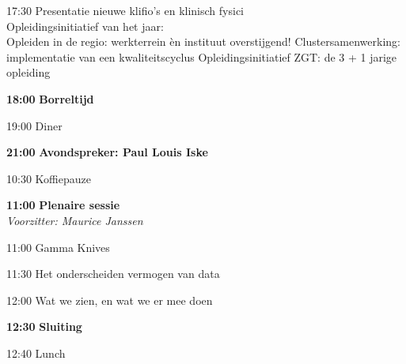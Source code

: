 \documentclass[a4paper,10pt]{report}
\begin{document}
\begin{multicols*}{3}
\begin{packed_enum}
        \vfill
    \columnbreak
{} %
    \vfill
\item[17:30] Presentatie nieuwe klifio's en klinisch fysici\vspace{2mm}\\Opleidingsinitiatief van het jaar:\vspace{2mm}\\
    \noindent
    Opleiden in de regio: werkterrein èn instituut overstijgend! 
    \vspace{1mm}
    Clustersamenwerking: implementatie van een kwa\-li\-teits\-cyclus 
    \vspace{1mm}
    Opleidingsinitiatief ZGT: de 3 + 1 jarige opleiding 
        \vfill
    \item[\textbf{18:00}] {\textbf{Borreltijd}}
        \vfill
    \item[19:00] Diner
        \vfill
    \item[\textbf{21:00}] {\textbf{Avondspreker: Paul Louis Iske}}
    \end{packed_enum}%

\vfill
{} %

\begin{packed_enum}
\item[{\color{DarkBlue}{\textbf{09:00}}}]{ }
        \vfill
\item[10:30] Koffiepauze
        \vfill
\item[\textbf{11:00}] {\textbf{Plenaire sessie}}\\\textit{Voorzitter: Maurice Janssen}
\item[11:00] Gamma Knives
\item[11:30] Het onderscheiden vermogen van data
\item[12:00] Wat we zien, en wat we er mee doen
        \vfill
\item[\textbf{12:30}] \textbf{Sluiting}
\vfill
\item[12:40] Lunch
\end{packed_enum}%


\end{multicols*}
\end{document}
